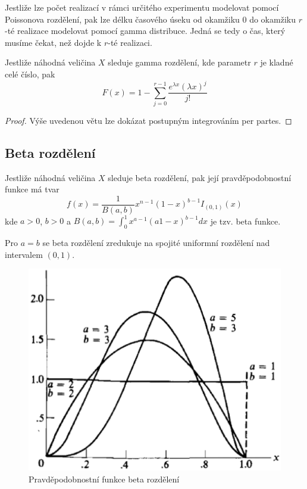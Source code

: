 Jestliže lze počet realizací v rámci určitého experimentu modelovat pomocí Poissonova rozdělení, pak lze délku časového úseku od okamžiku 0 do okamžiku $r$-té realizace modelovat pomocí gamma distribuce. Jedná se tedy o čas, který musíme čekat, než dojde k $r$-té realizaci.

\begin{theorem}
Jestliže náhodná veličina $X$ sleduje gamma rozdělení, kde parametr $r$ je kladné celé číslo, pak
\begin{equation*}
F(x) = 1 - \sum_{j = 0}^{r-1}\frac{e^{\lambda x}(\lambda x)^j}{j!}
\end{equation*}
\end{theorem}
\begin{proof}
Výše uvedenou větu lze dokázat postupným integrováním per partes.
\end{proof}

\subsection{Beta rozdělení}

\begin{definition}
Jestliže náhodná veličina $X$ sleduje beta rozdělení, pak její pravděpodobnostní funkce má tvar
\begin{equation*}
f(x) = \frac{1}{B(a,b)}x^{n-1}(1 - x)^{b - 1}I_{(0,1)}(x)
\end{equation*}
kde $a > 0$, $b > 0$ a $B(a, b) = \int_0^1 x^{a - 1}(a1 - x)^{b - 1}dx$ je tzv. beta funkce.
\end{definition}

Pro $a = b$ se beta rozdělení zredukuje na spojité uniformní rozdělení nad intervalem $(0, 1)$.

\begin{figure}[htp]
\centering
\includegraphics[scale = 0.5]{pictures/beta_distribution.eps}
\caption{Pravděpodobnostní funkce beta rozdělení}
\label{beta_distribution}
\end{figure}

